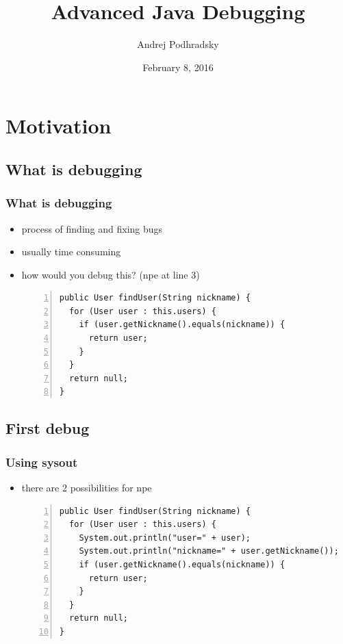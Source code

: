 \documentclass{beamer}
\begin{document}
\title{Advanced Java Debugging}   
\author{Andrej Podhradsky}
\date{February 8, 2016} 



\frame{\titlepage} 


\section{Motivation}

\subsection{What is debugging}
\begin{frame}[fragile]
\frametitle{What is debugging}
\begin{itemize}
\item process of finding and fixing bugs
\item usually time consuming
\item how would you debug this? (npe at line 3)
\vspace{0.2cm}
\begin{lstlisting}[numbers=left]
public User findUser(String nickname) {
  for (User user : this.users) {
    if (user.getNickname().equals(nickname)) {
      return user;
    }
  }
  return null;
}
\end{lstlisting}
\end{itemize}
\end{frame}


\subsection{First debug}
\begin{frame}[fragile]
\frametitle{Using sysout}
\begin{itemize}
\item there are 2 possibilities for npe
\vspace{0.2cm}
\begin{lstlisting}[numbers=left]
public User findUser(String nickname) {
  for (User user : this.users) {
    System.out.println("user=" + user);
    System.out.println("nickname=" + user.getNickname());
    if (user.getNickname().equals(nickname)) {
      return user;
    }
  }
  return null;
}
\end{lstlisting}
\end{itemize}
\end{frame}
\end{document}
